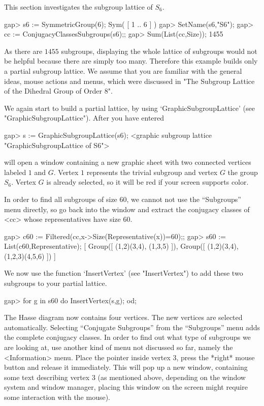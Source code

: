 
This section investigates the subgroup lattice of $S_6$.

\begintt
gap> s6 := SymmetricGroup(6);
Sym( [ 1 .. 6 ] )
gap> SetName(s6,"S6");
gap> cc := ConjugacyClassesSubgroups(s6);;
gap> Sum(List(cc,Size));
1455
\endtt

As there are $1455$ subgroups,  displaying  the whole lattice of  subgroups
would not  be helpful because  there are simply  too many.   Therefore this
example builds only a partial  subgroup lattice.   We  assume that you  are
familiar with  the  general ideas,  mouse   actions and  menus, which  were
discussed in "The Subgroup Lattice of the Dihedral Group of Order 8".

We again start to build a partial lattice, by using
`GraphicSubgroupLattice' (see "GraphicSubgroupLattice").  After you have
entered

\begintt
gap> s := GraphicSubgroupLattice(s6);
<graphic subgroup lattice "GraphicSubgroupLattice of S6">
\endtt

{\XGAP}  will open  a window  containing  a new  graphic  sheet with  two
connected vertices   labeled  $1$ and $G$.     Vertex  $1$ represents the
trivial subgroup and  vertex $G$ the group $S_6$.   Vertex $G$ is already
selected, so it will be red if your screen supports color.

In order  to  find all subgroups   of size $60$, we  cannot   not use the
``Subgroups'' menu directly, so go back into the  {\GAP} window and extract
the conjugacy classes of <cc> whose representatives have size $60$.

\begintt
gap> c60 := Filtered(cc,x->Size(Representative(x))=60);;
gap> s60 := List(c60,Representative);
[ Group([ (1,2)(3,4), (1,3,5) ]), Group([ (1,2)(3,4), (1,2,3)(4,5,6) ]) ]
\endtt

\label{xgapgap}
We now use the function `InsertVertex' (see "InsertVertex") to add
these two subgroups to your partial lattice.

\begintt
gap> for g in s60 do InsertVertex(s,g); od;
\endtt

The Hasse diagram now contains four vertices.
The new vertices are selected automatically.  Selecting ``Conjugate
Subgroups'' from the ``Subgroups'' menu adds the complete conjugacy classes.
In order to find out what type of subgroups we  are looking at, use another
kind of menu not  discussed so far,  namely the <Information>  menu.  Place
the pointer inside  vertex $3$, press the  *right* mouse button and release
it immediately.  This  will  pop  up a new   window,  containing some  text
describing vertex $3$  (as mentioned above,  depending on the window system
and  window manager, placing this  window on the  screen might require some
interaction with the mouse).

